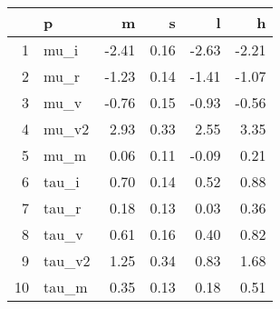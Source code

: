 \begin{table}[ht]
\centering
\begin{tabular}{rlrrrr}
  \hline
 & p & m & s & l & h \\ 
  \hline
1 & mu\_i & -2.41 & 0.16 & -2.63 & -2.21 \\ 
  2 & mu\_r & -1.23 & 0.14 & -1.41 & -1.07 \\ 
  3 & mu\_v & -0.76 & 0.15 & -0.93 & -0.56 \\ 
  4 & mu\_v2 & 2.93 & 0.33 & 2.55 & 3.35 \\ 
  5 & mu\_m & 0.06 & 0.11 & -0.09 & 0.21 \\ 
  6 & tau\_i & 0.70 & 0.14 & 0.52 & 0.88 \\ 
  7 & tau\_r & 0.18 & 0.13 & 0.03 & 0.36 \\ 
  8 & tau\_v & 0.61 & 0.16 & 0.40 & 0.82 \\ 
  9 & tau\_v2 & 1.25 & 0.34 & 0.83 & 1.68 \\ 
  10 & tau\_m & 0.35 & 0.13 & 0.18 & 0.51 \\ 
   \hline
\end{tabular}
\label{tab:param}
\end{table}
